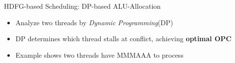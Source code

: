 \documentclass[handout]{beamer}
\begin{document}
\begin{CJK}{UTF8}{bkai}
            \begin{frame}{HDFG-based Scheduling: DP-based ALU-Allocation}
                \begin{itemize}
                    \pause
                    \item {Analyze two threads by \textit{Dynamic Programming}\footnotemark (DP)}
                    \pause
                    \item {DP determines which thread stalls at conflict, achieving \textbf{optimal OPC}}
                    \pause
                    \item {Example shows two threads have MMMAAA to process}
                \end{itemize}
                    \setcounter{subfigure}{0}
                    \pause
                    \vspace{-1em}
                    \begin{figure}[!ht]
                        \begin{center}
                            \hfill
                            \hfill
\end{center}
\end{figure}
\end{frame}
\end{CJK}
\end{document}
